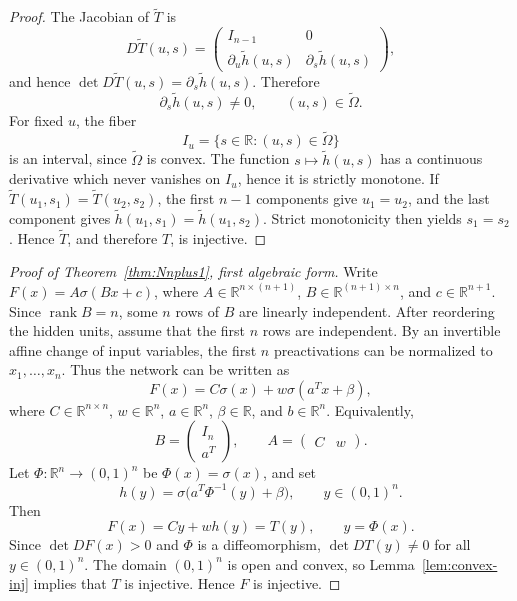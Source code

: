 \documentclass[a4paper,11pt]{article}
\theoremstyle{plain}
\theoremstyle{definition}
\theoremstyle{remark}
\DeclareMathOperator{\rank}{rank}
\begin{document}
\begin{proof}
The Jacobian of \(\widetilde T\) is
\[
D\widetilde T(u,s)=
\begin{pmatrix}
I_{n-1} & 0\\
\partial_u\widetilde h(u,s) & \partial_s\widetilde h(u,s)
\end{pmatrix},
\]
and hence \(\det D\widetilde T(u,s)=\partial_s\widetilde h(u,s)\). Therefore
\[
\partial_s\widetilde h(u,s)\ne0,
\qquad (u,s)\in\widetilde\Omega.
\]
For fixed \(u\), the fiber
\[
I_u=\{s\in\mathbb R:(u,s)\in\widetilde\Omega\}
\]
is an interval, since \(\widetilde\Omega\) is convex. The function \(s\mapsto\widetilde h(u,s)\) has a continuous derivative which never vanishes on \(I_u\), hence it is strictly monotone. If \(\widetilde T(u_1,s_1)=\widetilde T(u_2,s_2)\), the first \(n-1\) components give \(u_1=u_2\), and the last component gives \(\widetilde h(u_1,s_1)=\widetilde h(u_1,s_2)\). Strict monotonicity then yields \(s_1=s_2\). Hence \(\widetilde T\), and therefore \(T\), is injective.
\end{proof}

\begin{proof}[Proof of Theorem~\ref{thm:Nnplus1}, first algebraic form]
Write \(F(x)=A\sigma(Bx+c)\), where \(A\in\mathbb R^{n\times(n+1)}\), \(B\in\mathbb R^{(n+1)\times n}\), and \(c\in\mathbb R^{n+1}\). Since \(\rank B=n\), some \(n\) rows of \(B\) are linearly independent. After reordering the hidden units, assume that the first \(n\) rows are independent. By an invertible affine change of input variables, the first \(n\) preactivations can be normalized to \(x_1,\ldots,x_n\). Thus the network can be written as
\[
F(x)=C\sigma(x)+w\sigma(a^T x+\beta),
\]
where \(C\in\mathbb R^{n\times n}\), \(w\in\mathbb R^n\), \(a\in\mathbb R^n\), \(\beta\in\mathbb R\), and \(b\in\mathbb R^n\). Equivalently,
\[
B=\begin{pmatrix} I_n\\ a^T\end{pmatrix},
\qquad
A=\begin{pmatrix} C & w\end{pmatrix}.
\]
Let \(\Phi:\mathbb R^n\to(0,1)^n\) be \(\Phi(x)=\sigma(x)\), and set
\[
h(y)=\sigma\bigl(a^T\Phi^{-1}(y)+\beta\bigr),
\qquad y\in(0,1)^n.
\]
Then
\[
F(x)=Cy+w h(y)=T(y),
\qquad y=\Phi(x).
\]
Since \(\det DF(x)>0\) and \(\Phi\) is a diffeomorphism, \(\det DT(y)\ne0\) for all \(y\in(0,1)^n\). The domain \((0,1)^n\) is open and convex, so Lemma~\ref{lem:convex-inj} implies that \(T\) is injective. Hence \(F\) is injective.
\end{proof}
\end{document}
